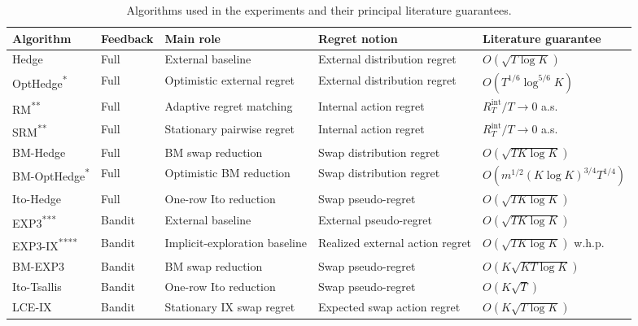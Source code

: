 \begin{table}[htbp]
    \centering
    \footnotesize
    \caption{Algorithms used in the experiments and their principal literature guarantees.}
    \label{tab:algorithm-summary}
    \begin{tabular}{@{}llp{2.55cm}p{3.15cm}p{3.65cm}@{}}
        \toprule
        Algorithm & Feedback & Main role & Regret notion & Literature guarantee \\
        \midrule
        Hedge
        & Full
        & External baseline
        & External distribution regret
        & $O(\sqrt{T\log K})$ \\
        OptHedge\textsuperscript{*}
        & Full
        & Optimistic external regret
        & External distribution regret
        & $O(T^{1/6}\log^{5/6}K)$ \\
        RM\textsuperscript{**}
        & Full
        & Adaptive regret matching
        & Internal action regret
        & $R_T^{\mathrm{int}}/T\to0$ a.s. \\
        SRM\textsuperscript{**}
        & Full
        & Stationary pairwise regret
        & Internal action regret
        & $R_T^{\mathrm{int}}/T\to0$ a.s. \\
        BM-Hedge
        & Full
        & BM swap reduction
        & Swap distribution regret
        & $O(\sqrt{TK\log K})$ \\
        BM-OptHedge\textsuperscript{*}
        & Full
        & Optimistic BM reduction
        & Swap distribution regret
        & $O\!\left(m^{1/2}(K\log K)^{3/4}T^{1/4}\right)$ \\
        Ito-Hedge
        & Full
        & One-row Ito reduction
        & Swap pseudo-regret
        & $O(\sqrt{TK\log K})$ \\
        \midrule
        EXP3\textsuperscript{***}
        & Bandit
        & External baseline
        & External pseudo-regret
        & $O(\sqrt{TK\log K})$ \\
        EXP3-IX\textsuperscript{****}
        & Bandit
        & Implicit-exploration baseline
        & Realized external action regret
        & $O(\sqrt{TK\log K})$ w.h.p. \\
        BM-EXP3
        & Bandit
        & BM swap reduction
        & Swap pseudo-regret
        & $O(K\sqrt{KT\log K})$ \\
        Ito-Tsallis
        & Bandit
        & One-row Ito reduction
        & Swap pseudo-regret
        & $O(K\sqrt{T})$ \\
        LCE-IX
        & Bandit
        & Stationary IX swap regret
        & Expected swap action regret
        & $O(K\sqrt{T\log K})$ \\
        \bottomrule
    \end{tabular}


\end{table}
